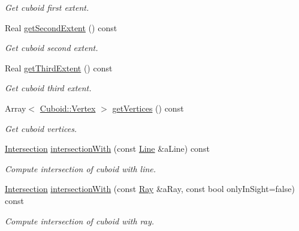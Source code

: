 \begin{DoxyCompactItemize}
\begin{DoxyCompactList}\small\item\em Get cuboid first extent. \end{DoxyCompactList}\item 
Real \hyperlink{classostk_1_1math_1_1geom_1_1d3_1_1objects_1_1_cuboid_a21bec63f825795671eeb56e084731453}{get\+Second\+Extent} () const
\begin{DoxyCompactList}\small\item\em Get cuboid second extent. \end{DoxyCompactList}\item 
Real \hyperlink{classostk_1_1math_1_1geom_1_1d3_1_1objects_1_1_cuboid_a8cc3b3e20f67bfd7de8230fb2c471a70}{get\+Third\+Extent} () const
\begin{DoxyCompactList}\small\item\em Get cuboid third extent. \end{DoxyCompactList}\item 
Array$<$ \hyperlink{classostk_1_1math_1_1geom_1_1d3_1_1objects_1_1_cuboid_a0d3440e0c30348ece10f3658130e9b55}{Cuboid\+::\+Vertex} $>$ \hyperlink{classostk_1_1math_1_1geom_1_1d3_1_1objects_1_1_cuboid_a46a7d78b2dcc261c2dbbf734d0837813}{get\+Vertices} () const
\begin{DoxyCompactList}\small\item\em Get cuboid vertices. \end{DoxyCompactList}\item 
\hyperlink{classostk_1_1math_1_1geom_1_1d3_1_1_intersection}{Intersection} \hyperlink{classostk_1_1math_1_1geom_1_1d3_1_1objects_1_1_cuboid_a821798e9d6f37cd6cafc6a34ef131f9a}{intersection\+With} (const \hyperlink{classostk_1_1math_1_1geom_1_1d3_1_1objects_1_1_line}{Line} \&a\+Line) const
\begin{DoxyCompactList}\small\item\em Compute intersection of cuboid with line. \end{DoxyCompactList}\item 
\hyperlink{classostk_1_1math_1_1geom_1_1d3_1_1_intersection}{Intersection} \hyperlink{classostk_1_1math_1_1geom_1_1d3_1_1objects_1_1_cuboid_a518146484563c222a5953aee578503b4}{intersection\+With} (const \hyperlink{classostk_1_1math_1_1geom_1_1d3_1_1objects_1_1_ray}{Ray} \&a\+Ray, const bool only\+In\+Sight=false) const
\begin{DoxyCompactList}\small\item\em Compute intersection of cuboid with ray. \end{DoxyCompactList}\item 

\end{DoxyCompactItemize}
